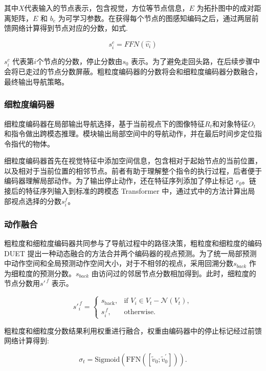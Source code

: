 \documentclass[bachelor]{thesis-uestc}
\begin{document}
其中$X$代表输入的节点表示，包含视觉，方位等节点信息，$E$ 为拓扑图中的成对距离矩阵，$E$ 和 $b_{e}$ 为可学习参数。在获得每个节点的图感知编码之后，通过两层前馈网络计算得到节点对应的分数，如式.

\begin{equation}
    s^c_i = FFN(\hat{v_i})
\label{}
\end{equation}

$s^c_i $ 代表第$i$个节点的分数，停止分数由$s_0$ 表示。为了避免走回头路，在后续步骤中会将已走过的节点分数屏蔽。粗粒度编码器的分数将会和细粒度编码器分数融合，最终输出导航策略。

\subsubsection{细粒度编码器}

细粒度编码器在局部输出导航选择，基于当前视点下的图像特征$R_t$和对象特征$O_t$ 和指令做出跨模态推理。模块输出局部空间中的导航动作，并在最后时间步定位指令指代的物体。

细粒度编码器首先在视觉特征中添加空间信息，包含相对于起始节点的当前位置，以及相对于当前位置的相邻节点。前者有助于理解整个指令的执行过程，后者便于编码器理解局部动作。为了输出停止动作，还在特征序列添加了停止标记 $r_0$。链接后的特征序列输入到标准的跨模态 Transformer 中，通过式中的方法计算出局部视点选择的分数$s^f_i$。

\subsubsection{动作融合}

粗粒度和细粒度编码器共同参与了导航过程中的路径决策，粗粒度和细粒度的编码DUET 提出一种动态融合的方法合并两个编码器的视点预测。为了统一局部预测中动作空间和全局预测动作空间大小，对于不相邻的视点，采用回溯分数$s_{back}$ 作为细粒度的预测分数。$s_{back}$ 由访问过的邻居节点分数相加得到。此时，细粒度的节点分数用$s'^{\,f}$ 表示。

\begin{equation}
    s'^{\,f}_{i} = 
\begin{cases} 
s_{\text{back}}, & \text{if } V_{i} \in V_{t} - \mathcal{N}(V_{t}), \\
s^{\,f}_{i}, & \text{otherwise}.
\end{cases}
\label{fusion}
\end{equation}

粗粒度和细粒度分数结果利用权重进行融合，权重由编码器中的停止标记经过前馈网络计算得到:

\begin{equation}
    \sigma_t = \text{Sigmoid}(\text{FFN}([\tilde{v}_0; \tilde{v}^{\prime}_0])).
\label{ffn}
\end{equation}
\end{document}
